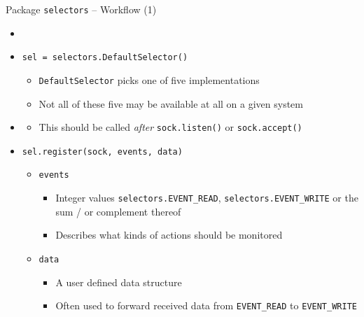 \begin{frame}{Package \texttt{selectors} -- Workflow (1)}
%
\begin{itemize}
\item {}
\item \texttt{sel = selectors.DefaultSelector()}
	\begin{itemize}
	\item \texttt{DefaultSelector} picks one of five implementations
	\item Not all of these five may be available at all on a given system
	\end{itemize}
\pause
\item {}
	\begin{itemize}
	\item This should be called \emph{after} \texttt{sock.listen()} or \texttt{sock.accept()}
	\end{itemize}
\pause
\item \texttt{sel.register(sock, events, data)}
	\begin{itemize}
	\item \texttt{events} 
		\begin{itemize}
		\item Integer values \texttt{selectors.EVENT\_READ}, \texttt{selectors.EVENT\_WRITE} or the sum / or complement thereof
		\item Describes what kinds of actions should be monitored
		\end{itemize}
	\item \texttt{data}
		\begin{itemize}
		\item A user defined data structure
		\item Often used to forward received data from \texttt{EVENT\_READ} to \texttt{EVENT\_WRITE}
		\end{itemize}
	\end{itemize}
\end{itemize}
%
\end{frame}



